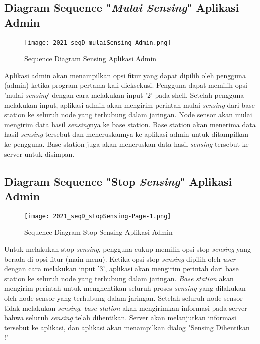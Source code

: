    \subsection{Diagram Sequence "\textit{Mulai Sensing}" Aplikasi Admin}
   
   \begin{figure}[H]
    	\centering  
    	\texttt{[image: 2021\_seqD\_mulaiSensing\_Admin.png]}  
    	\caption[Sequence Diagram Sensing Aplikasi Admin]{Sequence Diagram Sensing Aplikasi Admin} 
    	\label{fig:Sequence Diagram Mulai Sensing Aplikasi Admin} 
    \end{figure}
    
    Aplikasi admin akan menampilkan opsi fitur yang dapat dipilih oleh pengguna (admin) ketika program pertama kali dieksekusi. Pengguna dapat memilih opsi 'mulai \textit{sensing}' dengan cara melakukan input '2' pada shell. Setelah pengguna melakukan input, aplikasi admin akan mengirim perintah mulai \textit{sensing} dari base station ke seluruh node yang terhubung dalam jaringan. Node sensor akan mulai mengirim data hasil \textit{sensing}nya ke base station. Base station akan menerima data hasil \textit{sensing} tersebut dan meneruskannya ke aplikasi admin untuk ditampilkan ke pengguna. Base station juga akan meneruskan data hasil \textit{sensing} tersebut ke server untuk disimpan. 
   
   \subsection{Diagram Sequence "Stop \textit{Sensing}" Aplikasi Admin}
   
   \begin{figure}[H]
    	\centering  
    	\texttt{[image: 2021\_seqD\_stopSensing-Page-1.png]}  
    	\caption[Sequence Diagram Stop Sensing Aplikasi Admin]{Sequence Diagram Stop Sensing Aplikasi Admin} 
    	\label{fig:Sequence Diagram Stop Sensing Aplikasi Admin} 
    \end{figure}
   
   Untuk melakukan stop \textit{sensing}, pengguna cukup memilih opsi stop \textit{sensing} yang berada di opsi fitur (main menu). Ketika opsi stop \textit{sensing} dipilih oleh \textit{user} dengan cara melakukan input '3', aplikasi akan mengirim perintah dari base station ke seluruh node yang terhubung dalam jaringan. \textit{Base station} akan mengirim perintah untuk menghentikan seluruh proses \textit{sensing} yang dilakukan oleh node sensor yang terhubung dalam jaringan. Setelah seluruh node sensor tidak melakukan \textit{sensing}, \textit{base station} akan mengirimkan informasi pada server bahwa seluruh \textit{sensing} telah dihentikan. Server akan melanjutkan informasi tersebut ke aplikasi, dan aplikasi akan menampilkan dialog "Sensing Dihentikan !"
  

